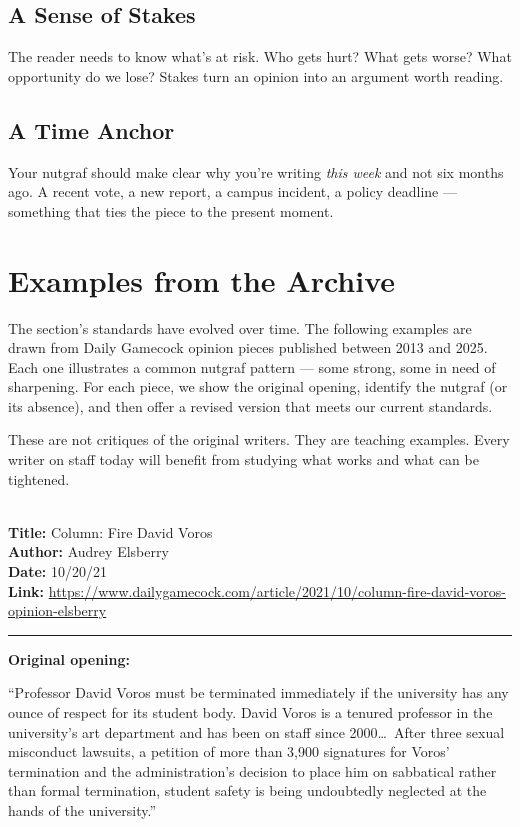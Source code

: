 \documentclass[12pt]{article}
\newcounter{examplenum}
\newcommand{\totalexamples}{10}
\newcommand{\exampleheader}[4]{%
    \newpage
    \stepcounter{examplenum}%
    \noindent{\large\bfseries\color{garnet} Example \theexamplenum\ of \totalexamples}\\[6pt]
    \textbf{Title:} #1\\
    \textbf{Author:} #2\\
    \textbf{Date:} #3\\
    \textbf{Link:} \url{#4}\\[4pt]
    \noindent\rule{\textwidth}{0.4pt}
    \vspace{6pt}
}
\begin{document}
\subsection*{A Sense of Stakes}
The reader needs to know what's at risk. Who gets hurt? What gets worse? What opportunity do we lose? Stakes turn an opinion into an argument worth reading.

\subsection*{A Time Anchor}
Your nutgraf should make clear why you're writing \textit{this week} and not six months ago. A recent vote, a new report, a campus incident, a policy deadline --- something that ties the piece to the present moment.

\section*{Examples from the Archive}

The section's standards have evolved over time. The following examples are drawn from Daily Gamecock opinion pieces published between 2013 and 2025. Each one illustrates a common nutgraf pattern --- some strong, some in need of sharpening. For each piece, we show the original opening, identify the nutgraf (or its absence), and then offer a revised version that meets our current standards.

These are not critiques of the original writers. They are teaching examples. Every writer on staff today will benefit from studying what works and what can be tightened.

\exampleheader{Column: Fire David Voros}{Audrey Elsberry}{10/20/21}{https://www.dailygamecock.com/article/2021/10/column-fire-david-voros-opinion-elsberry}

\begin{promptbox}
\textbf{Original opening:}

``Professor David Voros must be terminated immediately if the university has any ounce of respect for its student body. David Voros is a tenured professor in the university's art department and has been on staff since 2000\ldots\ After three sexual misconduct lawsuits, a petition of more than 3,900 signatures for Voros' termination and the administration's decision to place him on sabbatical rather than formal termination, student safety is being undoubtedly neglected at the hands of the university.''
\end{promptbox}
\end{document}

